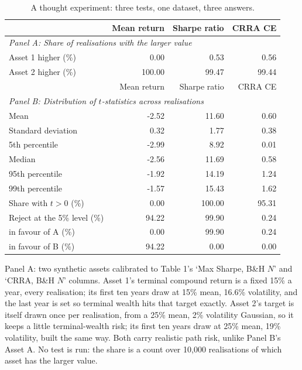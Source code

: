 \begin{table}[htbp]
\centering
\footnotesize
\caption{A thought experiment: three tests, one dataset, three answers.}
\label{tab:experiment}
\begin{threeparttable}
\begin{tabular}{lrrr}
\toprule
 & {Mean return} & {Sharpe ratio} & {CRRA CE} \\
\midrule
\multicolumn{4}{l}{\textit{Panel A: Share of realisations with the larger value}} \\
Asset 1 higher (\%) & 0.00 & 0.53 & 0.56 \\
Asset 2 higher (\%) & 100.00 & 99.47 & 99.44 \\
\addlinespace
\midrule
 & {Mean return} & {Sharpe ratio} & {CRRA CE} \\
\midrule
\multicolumn{4}{l}{\textit{Panel B: Distribution of $t$-statistics across realisations}} \\
Mean & -2.52 & 11.60 & 0.60 \\
Standard deviation & 0.32 & 1.77 & 0.38 \\
5th percentile & -2.99 & 8.92 & 0.01 \\
Median & -2.56 & 11.69 & 0.58 \\
95th percentile & -1.92 & 14.19 & 1.24 \\
99th percentile & -1.57 & 15.43 & 1.62 \\
Share with $t>0$ (\%) & 0.00 & 100.00 & 95.31 \\
Reject at the 5\% level (\%) & 94.22 & 99.90 & 0.24 \\
\quad in favour of A (\%) & 0.00 & 99.90 & 0.24 \\
\quad in favour of B (\%) & 94.22 & 0.00 & 0.00 \\
\bottomrule
\end{tabular}
\begin{tablenotes}[flushleft]\footnotesize
\item Panel A: two synthetic assets calibrated to Table 1's `Max Sharpe, B\&H $N$' and `CRRA, B\&H $N$' columns. Asset 1's terminal compound return is a fixed 15\% a year, every realisation; its first ten years draw at 15\% mean, 16.6\% volatility, and the last year is set so terminal wealth hits that target exactly. Asset 2's target is itself drawn once per realisation, from a 25\% mean, 2\% volatility Gaussian, so it keeps a little terminal-wealth risk; its first ten years draw at 25\% mean, 19\% volatility, built the same way. Both carry realistic path risk, unlike Panel B's Asset A. No test is run: the share is a count over 10,000 realisations of which asset has the larger value.

\end{tablenotes}
\end{threeparttable}
\end{table}
